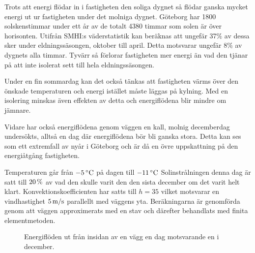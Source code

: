 Trots att energi flödar in i fastigheten den soliga dygnet så flödar ganska mycket energi 
ut ur fastigheten under det molniga dygnet. Göteborg har 1800 solskenstimmar under ett
 år av de totalt 4380 timmar som solen är över horisonten. Utifrån SMHI:s väderstatistik \cite{SMHIdata}
 kan beräknas att ungefär 37\% av dessa sker under eldningssäsongen, oktober till april. 
 Detta motsvarar ungefär 8\% av dygnets alla timmar. Tyvärr så förlorar fastigheten mer 
 energi än vad den tjänar på att inte isolerat sett till hela eldningssäsongen.

Under en fin sommardag kan det också tänkas att fastigheten värms över den önskade 
temperaturen och energi istället måste läggas på kylning. Med en isolering minskas även 
effekten av detta och energiflödena blir mindre om jämnare.


Vidare har också energiflödena genom väggen en kall, molnig decemberdag undersökts, 
alltså en dag där energiflödena bör bli ganska stora. Detta kan ses som ett extremfall av
nyår i Göteborg och är då en övre uppskattning på den energiåtgång fastigheten.

 Temperaturen går från $\unit[-5]{^\circ C}$ på dagen till $\unit[-11]{^\circ C}$ 
 Solinstrålningen denna dag är satt till $\unit[20]{\%}$ av vad den skulle varit den den 
 sista december om det varit helt klart. Konvektionskoefficienten har satts till $h=35$ 
 vilket motsvarar en vindhastighet $\unit[5]{m/s}$ parallellt med väggens yta. 
 Beräkningarna är genomförda genom att väggen approximerats med en stav och 
 därefter behandlats med finita elementmetoden.


\begin{figure}[hpbt]
\centering
{}\vspace{1cm}
\caption{\label{fig:wall_dec} Energiflöden ut från insidan av en vägg en dag motsvarande en i december.
}
\end{figure}

